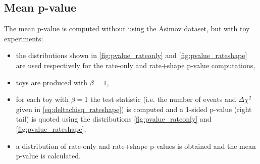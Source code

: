 %



\subsection {Mean p-value}
\label{subsec:pvalue_mean}

The mean p-value is computed without using the Asimov dataset, but with toy experiments:
\begin{itemize}
\item the distributions shown in \cref{fig:pvalue_rateonly} and \cref{fig:pvalue_rateshape} 
	are used respectively for the rate-only and rate+shape p-value computations,
\item \NumToysLarge toys are produced with $\beta = 1$, 
\item for each toy with $\beta=1$ the test statistic (i.e. the number of events and 
	$\Delta \chi^2$ given in \cref{eq:deltachisq_rateshape})
	is computed and a 1-sided p-value (right tail) is quoted using the distributions 
	\cref{fig:pvalue_rateonly} and \cref{fig:pvalue_rateshape}, 
\item a distribution of rate-only and rate+shape p-values is obtained and the mean p-value is calculated.
\end{itemize}

